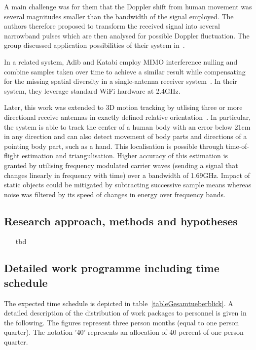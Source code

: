 \documentclass[12pt]{article}
\begin{document}
A main challenge was for them that the Doppler shift from human movement was several magnitudes smaller than the bandwidth of the signal employed.
The authors therefore proposed to transform the received signal into several narrowband pulses which are then analysed for possible Doppler fluctuation.
The group discussed application possibilities of their system in~\cite{RFSensing_Kellog_2014}.

In a related system, Adib and Katabi employ MIMO interference nulling and combine samples taken over time to achieve a similar result while compensating for the missing spatial diversity in a single-antenna receiver system~\cite{Pervasive_Adib_2013}.
In their system, they leverage standard WiFi hardware at 2.4GHz.

Later, this work was extended to 3D motion tracking by utlising three or more directional receive antennas in exactly defined relative orientation~\cite{RFSensing_Adib_2014}. 
In particular, the system is able to track the center of a human body with an error below 21cm in any direction and can also detect movement of body parts and directions of a pointing body part, such as a hand. 
This localisation is possible through time-of-flight estimation and triangulisation.
Higher accuracy of this estimation is granted by utilising frequency modulated carrier waves (sending a signal that changes linearly in frequency with time) over a bandwidth of 1.69GHz.
Impact of static objects could be mitigated by subtracting successive sample means whereas noise was filtered by its speed of changes in energy over frequency bands. 

\subsection*{Research approach, methods and hypotheses}
\begin{itemize}
 \item[\color{blue}tbd]
\end{itemize}
\subsection*{Detailed work programme including time schedule}
The expected time schedule is depicted in table~\ref{tableGesamtueberblick}. 
A detailed description of the distribution of work packages to personnel is given in the following.
The figures represent three person months (equal to one person quarter).
The notation '40' represents an allocation of 40 percent of one person quarter. 
\end{document}
